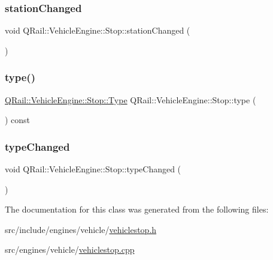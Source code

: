 \subsubsection{\texorpdfstring{stationChanged}{stationChanged}}
{\footnotesize\ttfamily void Q\+Rail\+::\+Vehicle\+Engine\+::\+Stop\+::station\+Changed (\begin{DoxyParamCaption}{ }\end{DoxyParamCaption})\hspace{0.3cm}{\ttfamily [signal]}}

\mbox{\label{classQRail_1_1VehicleEngine_1_1Stop_abe8f35c16d98f1ea6bd95a525f90c0aa}} 
\subsubsection{\texorpdfstring{type()}{type()}}
{\footnotesize\ttfamily \mbox{\hyperlink{classQRail_1_1VehicleEngine_1_1Stop_af078938bc06ff906b6fc843d8c0206fa}{Q\+Rail\+::\+Vehicle\+Engine\+::\+Stop\+::\+Type}} Q\+Rail\+::\+Vehicle\+Engine\+::\+Stop\+::type (\begin{DoxyParamCaption}{ }\end{DoxyParamCaption}) const}

\mbox{\label{classQRail_1_1VehicleEngine_1_1Stop_a4930b684f8b240cac0157edc5e2d0a08}} 
\subsubsection{\texorpdfstring{typeChanged}{typeChanged}}
{\footnotesize\ttfamily void Q\+Rail\+::\+Vehicle\+Engine\+::\+Stop\+::type\+Changed (\begin{DoxyParamCaption}{ }\end{DoxyParamCaption})\hspace{0.3cm}{\ttfamily [signal]}}



The documentation for this class was generated from the following files\+:\begin{DoxyCompactItemize}
\item 
src/include/engines/vehicle/\mbox{\hyperlink{vehiclestop_8h}{vehiclestop.\+h}}\item 
src/engines/vehicle/\mbox{\hyperlink{vehiclestop_8cpp}{vehiclestop.\+cpp}}\end{DoxyCompactItemize}
